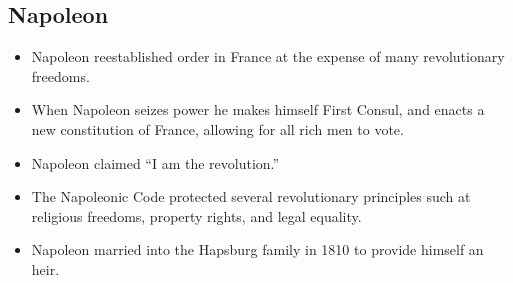 \documentclass{article}
\begin{document}
\begin{spacing}{1.2}
    \section{Napoleon}
    \begin{itemize}
        \item Napoleon reestablished order in France at the expense of many
            revolutionary freedoms.
        \item When Napoleon seizes power he makes himself First Consul, and
            enacts a new constitution of France, allowing for all rich men to
            vote.
        \item Napoleon claimed ``I am the revolution.''
        \item The Napoleonic Code protected several revolutionary principles
            such at religious freedoms, property rights, and legal equality.
        \item Napoleon married into the Hapsburg family in 1810 to provide
            himself an heir.
    \end{itemize}
\end{spacing}
\end{document}
